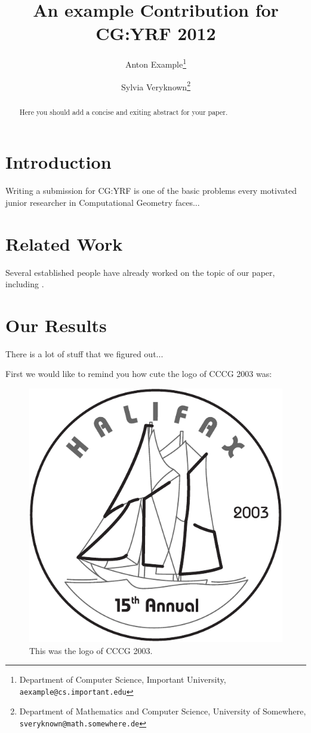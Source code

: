 \documentclass{cgyrf12}
\title{An example Contribution for CG:YRF 2012}
\author{Anton Example\thanks{Department of Computer Science,
        Important University, {\tt aexample@cs.important.edu}}
        \and
        Sylvia Veryknown\thanks{Department of Mathematics and Computer
        Science, University of Somewhere, {\tt sveryknown@math.somewhere.de}}}
\begin{document}
\maketitle

\begin{abstract}
Here you should add a concise and exiting abstract for your paper.
\end{abstract}

\section{Introduction}

Writing a submission for CG:YRF is one of the basic problems every motivated
junior researcher in Computational Geometry faces...

\section{Related Work}
Several established people have already worked on the topic of our paper,
including \cite{abghz-dfstkcd-2000}.

\section{Our Results}
There is a lot of stuff that we figured out...

First we would like to remind you how cute the logo of CCCG 2003 was:

\begin{figure}[h]
  \centering
  \includegraphics[width=.8\columnwidth]{cccgLogo}
  \caption{This was the logo of CCCG 2003.}
  \label{fig:logo}
\end{figure}
\end{document}
